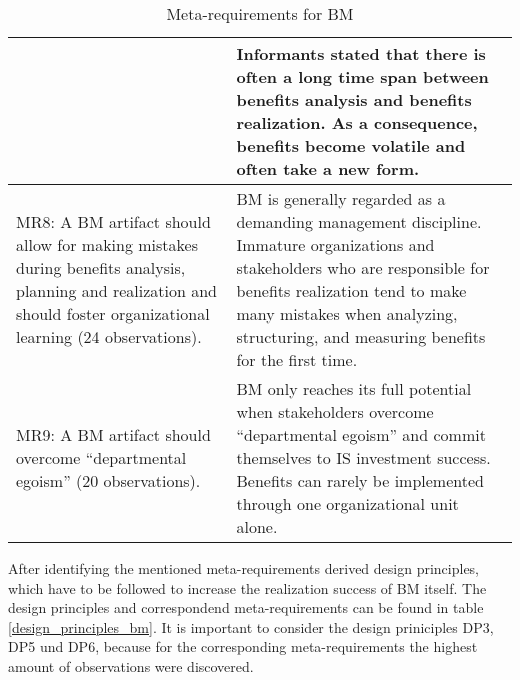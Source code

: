 \begin{table}[H]
\begin{tabular}{|p{6cm}|p{9cm}|}
&
Informants stated that there is often a long time span between benefits analysis and benefits realization. As a consequence, benefits become volatile and often take a new form.\\
\hline
MR8: A BM artifact should allow for making mistakes during benefits analysis, planning and realization and should foster organizational learning (24 observations).
&
BM is generally regarded as a demanding management discipline. Immature organizations and stakeholders who are responsible for benefits realization tend to make many mistakes when analyzing, structuring, and measuring benefits for the first time.\\
\hline
MR9: A BM artifact should overcome “departmental egoism” (20 observations).
&
BM only reaches its full potential when stakeholders overcome “departmental egoism” and commit themselves to IS investment success. Benefits can rarely be implemented through one organizational unit alone.\\
\hline
  \end{tabular}
  \caption{Meta-requirements for BM \citep[p.7f.]{ahlemann_exploiting_2013}}
	\label{meta_requirements_bm}
\end{table}


After identifying the mentioned meta-requirements \citet{ahlemann_exploiting_2013} derived design principles, which have to be followed to increase the realization success of BM itself. The design principles and correspondend meta-requirements can be found in table \ref{design_principles_bm}. It is important to consider the design priniciples DP3, DP5 und DP6, because for the corresponding meta-requirements the highest amount of observations were discovered.

